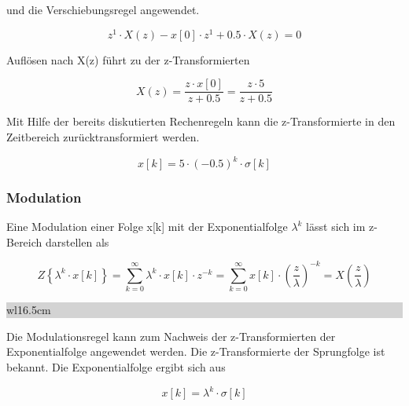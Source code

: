 \noindent und die Verschiebungsregel angewendet.

\begin{equation}\label{eq:fivefourtyeight}
z^{1} \cdot X\left(z\right)-x\left[0\right]\cdot z^{1} +0.5\cdot X\left(z\right)=0
\end{equation}

\noindent Aufl\"{o}sen nach X(z) f\"{u}hrt zu der z-Transformierten

\begin{equation}\label{eq:fivefourtynine}
X\left(z\right)=\frac{z\cdot x\left[0\right]}{z+0.5} =\frac{z\cdot 5}{z+0.5}
\end{equation}

\noindent Mit Hilfe der bereits diskutierten Rechenregeln kann die z-Transformierte in den Zeitbereich zur\"{u}cktransformiert werden.

\begin{equation}\label{eq:fivefifty}
x\left[k\right]=5\cdot \left(-0.5\right)^{k} \cdot \sigma \left[k\right]
\end{equation}

\subsubsection{Modulation}

\noindent Eine Modulation einer Folge x[k] mit der Exponentialfolge $\lambda^{k}$ l\"{a}sst sich im z-Bereich darstellen als

\begin{equation}\label{eq:fivefiftyone}
Z\left\{\lambda ^{k} \cdot x\left[k\right]\right\}=\sum _{k=0}^{\infty }\lambda ^{k} \cdot x\left[k\right]\cdot z^{-k}  =\sum _{k=0}^{\infty }x\left[k\right]\cdot \left(\frac{z}{\lambda } \right)^{-k}  =X\left(\frac{z}{\lambda } \right)
\end{equation}

\noindent
\colorbox{lightgray}{%
%
\renewcommand\arraystretch{0.6}%
\begin{tabular}{ wl{16.5cm} }
{\selectfont{Beispiel: Modulation}}
\end{tabular}%
}\medskip

\noindent Die Modulationsregel kann zum Nachweis der z-Transformierten der Exponentialfolge angewendet werden. Die z-Transformierte der Sprungfolge ist bekannt. Die Exponentialfolge ergibt sich aus

\begin{equation}\label{eq:fivefiftytwo}
x\left[k\right]=\lambda ^{k} \cdot \sigma \left[k\right]
\end{equation}


